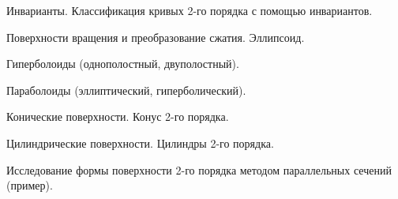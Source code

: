 \begin{question}
Инварианты. Классификация кривых 2-го порядка с помощью
инвариантов.
\end{question}
\begin{question}
Поверхности вращения и преобразование сжатия. Эллипсоид.
\end{question}
\begin{question}
Гиперболоиды (однополостный, двуполостный).
\end{question}
\begin{question}
Параболоиды (эллиптический, гиперболический).
\end{question}
\begin{question}
Конические поверхности. Конус 2-го порядка.
\end{question}
\begin{question}
Цилиндрические поверхности. Цилиндры 2-го порядка.
\end{question}
\begin{question}
Исследование формы поверхности 2-го порядка методом параллельных
сечений (пример).
\end{question}